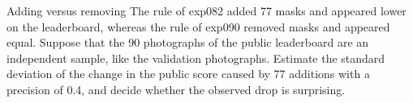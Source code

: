 \begin{exercise}{Adding versus removing}
The rule of exp082 added 77 masks and appeared lower on the leaderboard, whereas the rule of exp090
removed masks and appeared equal. Suppose that the 90 photographs of the public leaderboard are an
independent sample, like the validation photographs. Estimate the standard deviation of the change in
the public score caused by 77 additions with a precision of 0.4, and decide whether the observed drop
is surprising.
\end{exercise}
